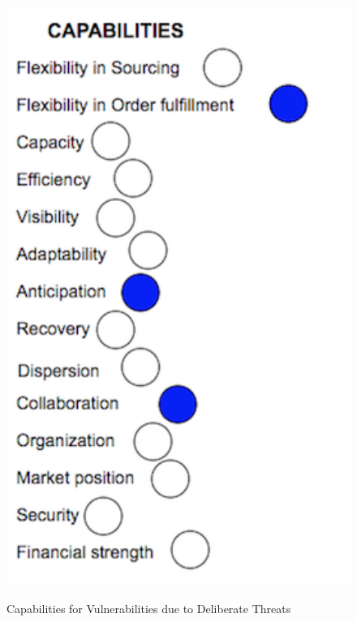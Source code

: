 \begin{figure}[H]
  \centering
  \includegraphics[width=4.5in]{figures/V5.png}\\
  \caption{Capabilities for Vulnerabilities due to Deliberate Threats}\label{V5}
\end{figure}  

